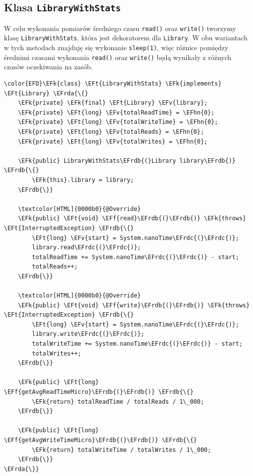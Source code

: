 \documentclass[11pt]{article}
\newcommand{\EFk}[1]{\textcolor{EFk}{#1}} %
\newcommand{\EFf}[1]{\textcolor{EFf}{#1}} %
\newcommand{\EFv}[1]{\textcolor{EFv}{#1}} %
\newcommand{\EFt}[1]{\textcolor{EFt}{#1}} %
\newcommand{\EFhn}[1]{\textcolor{EFhn}{#1}} %
\newcommand{\EFrda}[1]{#1} %
\newcommand{\EFrdb}[1]{\textcolor{EFrdb}{#1}} %
\newcommand{\EFrdc}[1]{\textcolor{EFrdc}{#1}} %
\begin{document}
\subsection*{Klasa \texttt{LibraryWithStats}}
\label{sec:org94563e6}
W celu wykonania pomiarów średniego czasu \texttt{read()} oraz \texttt{write()} tworzymy klasę \texttt{LibraryWithStats},
która jest dekoratorem dla \texttt{Library}.
W obu wariantach w tych metodach znajduję się wykonanie \texttt{sleep(1)},
więc różnice pomiędzy średnimi czasami wykonania \texttt{read()} oraz \texttt{write()} będą wynikały z różnych
czasów oczekiwania na zasób.

\begin{Code}
\begin{Verbatim}
\color{EFD}\EFk{class} \EFt{LibraryWithStats} \EFk{implements} \EFt{Library} \EFrda{\{}
    \EFk{private} \EFk{final} \EFt{Library} \EFv{library};
    \EFk{private} \EFt{long} \EFv{totalReadTime} = \EFhn{0};
    \EFk{private} \EFt{long} \EFv{totalWriteTime} = \EFhn{0};
    \EFk{private} \EFt{long} \EFv{totalReads} = \EFhn{0};
    \EFk{private} \EFt{long} \EFv{totalWrites} = \EFhn{0};

    \EFk{public} LibraryWithStats\EFrdb{(}Library library\EFrdb{)} \EFrdb{\{}
        \EFk{this}.library = library;
    \EFrdb{\}}

    \textcolor[HTML]{0000b0}{@Override}
    \EFk{public} \EFt{void} \EFf{read}\EFrdb{(}\EFrdb{)} \EFk{throws} \EFt{InterruptedException} \EFrdb{\{}
        \EFt{long} \EFv{start} = System.nanoTime\EFrdc{(}\EFrdc{)};
        library.read\EFrdc{(}\EFrdc{)};
        totalReadTime += System.nanoTime\EFrdc{(}\EFrdc{)} - start;
        totalReads++;
    \EFrdb{\}}

    \textcolor[HTML]{0000b0}{@Override}
    \EFk{public} \EFt{void} \EFf{write}\EFrdb{(}\EFrdb{)} \EFk{throws} \EFt{InterruptedException} \EFrdb{\{}
        \EFt{long} \EFv{start} = System.nanoTime\EFrdc{(}\EFrdc{)};
        library.write\EFrdc{(}\EFrdc{)};
        totalWriteTime += System.nanoTime\EFrdc{(}\EFrdc{)} - start;
        totalWrites++;
    \EFrdb{\}}

    \EFk{public} \EFt{long} \EFf{getAvgReadTimeMicro}\EFrdb{(}\EFrdb{)} \EFrdb{\{}
        \EFk{return} totalReadTime / totalReads / 1\_000;
    \EFrdb{\}}

    \EFk{public} \EFt{long} \EFf{getAvgWriteTimeMicro}\EFrdb{(}\EFrdb{)} \EFrdb{\{}
        \EFk{return} totalWriteTime / totalWrites / 1\_000;
    \EFrdb{\}}
\EFrda{\}}
\end{Verbatim}
\end{Code}
\end{document}
